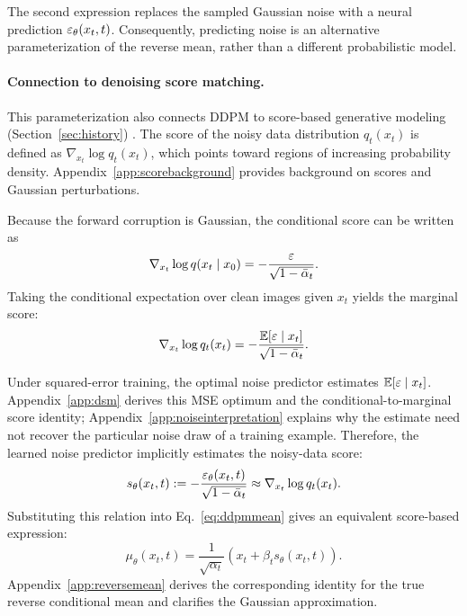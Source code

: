 The second expression replaces the sampled Gaussian noise
with a neural prediction $\varepsilon_\theta(x_t,t)$.
Consequently, predicting noise is an alternative
parameterization of the reverse mean, rather than a
different probabilistic model.

\paragraph{Connection to denoising score matching.}
This parameterization also connects DDPM to score-based generative
modeling (Section~\ref{sec:history}) \cite{song2019score}. The score of the noisy
data distribution $q_t(x_t)$ is defined as
$\nabla_{x_t}\log q_t(x_t)$, which points toward regions
of increasing probability density.
Appendix~\ref{app:scorebackground} provides background on scores and
Gaussian perturbations.

Because the forward corruption is Gaussian, the
conditional score can be written as
\begin{equation}
\nabla_{x_t}\log q(x_t\mid x_0)
=-\frac{\varepsilon}{\sqrt{1-\bar{\alpha}_t}}.
\end{equation}
Taking the conditional expectation over clean images
given $x_t$ yields the marginal score:
\begin{equation}
\nabla_{x_t}\log q_t(x_t)
=-\frac{\mathbb{E}[\varepsilon\mid x_t]}{\sqrt{1-\bar{\alpha}_t}}.
\end{equation}

Under squared-error training, the optimal noise predictor
estimates $\mathbb{E}[\varepsilon\mid x_t]$. Appendix~\ref{app:dsm} derives this
MSE optimum and the conditional-to-marginal score identity;
Appendix~\ref{app:noiseinterpretation} explains why the estimate need
not recover the particular noise draw of a training example.
Therefore, the learned
noise predictor implicitly estimates the noisy-data score:
\begin{equation}
s_\theta(x_t,t):=
-\frac{\varepsilon_\theta(x_t,t)}{\sqrt{1-\bar{\alpha}_t}}
\approx\nabla_{x_t}\log q_t(x_t).
\label{eq:scoreestimate}
\end{equation}
Substituting this relation into Eq.~\eqref{eq:ddpmmean}
gives an equivalent score-based expression:
\begin{equation}
\mu_\theta(x_t,t)
=\frac{1}{\sqrt{\alpha_t}}
\left(x_t+\beta_t s_\theta(x_t,t)\right).
\end{equation}
Appendix~\ref{app:reversemean} derives the corresponding identity for
the true reverse conditional mean and clarifies the Gaussian approximation.

